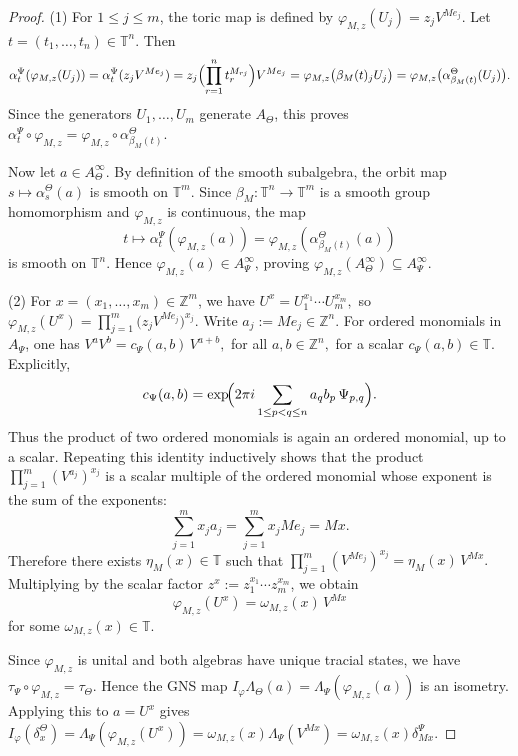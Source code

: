 \documentclass[11pt]{amsart}
\theoremstyle{definition}
\theoremstyle{remark}
\newcommand{\T}{\mathbb{T}}
\newcommand{\Z}{\mathbb{Z}}
\begin{document}
\begin{proof}
(1) For $1\le j\le m$, the toric map is defined by $\varphi_{M,z}(U_j)=z_jV^{Me_j}.$
Let $t=(t_1,\ldots,t_n)\in\T^n$. Then
\[
\alpha_t^\Psi(\varphi_{M,z}(U_j))
=
\alpha_t^\Psi(z_jV^{Me_j})
=
z_j\Bigl(\prod_{r=1}^n t_r^{M_{rj}}\Bigr)V^{Me_j}
=
\varphi_{M,z}\bigl(\beta_M(t)_jU_j\bigr)
=
\varphi_{M,z}\bigl(\alpha_{\beta_M(t)}^\Theta(U_j)\bigr).
\]
Since the generators $U_1,\ldots,U_m$ generate $A_\Theta$, this proves $\alpha_t^\Psi\circ\varphi_{M,z}
=\varphi_{M,z}\circ \alpha_{\beta_M(t)}^\Theta.$

Now let $a\in A_\Theta^\infty$.  By definition of the smooth subalgebra, the orbit map $s\longmapsto \alpha_s^\Theta(a)$
is smooth on $\T^m$. Since $\beta_M\colon \T^n\to\T^m$ is a smooth group
homomorphism and $\varphi_{M,z}$ is continuous, the map
\[
t\longmapsto \alpha_t^\Psi(\varphi_{M,z}(a))
=
\varphi_{M,z}(\alpha_{\beta_M(t)}^\Theta(a))
\]
is smooth on $\T^n$. Hence $\varphi_{M,z}(a)\in A_\Psi^\infty$, proving
$\varphi_{M,z}(A_\Theta^\infty)\subseteq A_\Psi^\infty.$

(2) For $x=(x_1,\ldots,x_m)\in\Z^m$, we have $U^x=U_1^{x_1}\cdots U_m^{x_m},$
so
$\varphi_{M,z}(U^x)=\prod_{j=1}^m \bigl(z_jV^{Me_j}\bigr)^{x_j}.$ Write $a_j:=Me_j\in\Z^n.$
For ordered monomials in $A_\Psi$, one has $V^aV^b=c_\Psi(a,b)\,V^{a+b},$ for all 
$ a,b\in\Z^n,$
for a scalar $c_\Psi(a,b)\in\T$. Explicitly,
\[
c_\Psi(a,b)
=
\exp\!\Bigl(2\pi i\sum_{1\le p<q\le n} a_qb_p\,\Psi_{p,q}\Bigr).
\]
Thus the product of two ordered monomials is again an ordered monomial, up to
a scalar. Repeating this identity inductively shows that the product $\prod_{j=1}^m (V^{a_j})^{x_j}$
is a scalar multiple of the ordered monomial whose exponent is the sum of the
exponents:
\[
\sum_{j=1}^m x_j a_j
=
\sum_{j=1}^m x_jMe_j
=
Mx.
\]
Therefore there exists $\eta_M(x)\in\T$ such that $\prod_{j=1}^m (V^{Me_j})^{x_j}=\eta_M(x)\,V^{Mx}.$
Multiplying by the scalar factor $z^x:=z_1^{x_1}\cdots z_m^{x_m}$, we obtain
\[
\varphi_{M,z}(U^x)=\omega_{M,z}(x)\,V^{Mx}
\]
for some $\omega_{M,z}(x)\in\T$.

Since $\varphi_{M,z}$ is unital and both algebras have unique tracial states, we have
$\tau_\Psi\circ\varphi_{M,z}=\tau_\Theta.$
Hence the GNS map $I_\varphi\Lambda_\Theta(a)=\Lambda_\Psi(\varphi_{M,z}(a))$
is an isometry. Applying this to $a=U^x$ gives
$I_\varphi(\delta_x^\Theta)
=\Lambda_\Psi(\varphi_{M,z}(U^x))
=\omega_{M,z}(x)\Lambda_\Psi(V^{Mx})
=\omega_{M,z}(x)\delta_{Mx}^\Psi.$


\end{proof}
\end{document}
